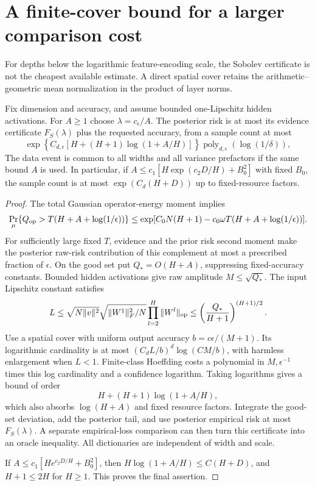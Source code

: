 \section{A finite-cover bound for a larger comparison cost}
\label{sec:amgm-large-cost}
For depths below the logarithmic feature-encoding scale, the Sobolev certificate is not the cheapest available estimate. A direct spatial cover retains the arithmetic--geometric mean normalization in the product of layer norms.

\begin{proposition}[AM--GM certificate]
\label{prop:amgm-certificate}
Fix dimension and accuracy, and assume bounded one-Lipschitz hidden activations. For $A\ge1$ choose $\lambda=c_\epsilon/A$. The posterior risk is at most its evidence certificate $F_S(\lambda)$ plus the requested accuracy, from a sample count at most
\begin{equation}
 \exp\left\{C_{d,\epsilon}\left[H+
              (H+1)\log(1+A/H)\right]\right\}
              \operatorname{poly}_{d,\epsilon}(\log(1/\delta)),
 \label{eq:amgm-sample}
\end{equation}
The data event is common to all widths and all variance prefactors if the same bound $A$ is used. In particular, if
$A\le c_1[H\exp(c_2D/H)+B_0^2]$ with fixed $B_0$, the sample count is at most $\exp(C_d(H+D))$ up to fixed-resource factors.
\end{proposition}
\begin{proof}
The total Gaussian operator-energy moment implies
\[
 \Pr_\mu\{Q_{\rm op}>T(H+A+\log(1/\epsilon))\}
 \le\exp[C_0N(H+1)-c_0\omega T(H+A+\log(1/\epsilon))].
\]
For sufficiently large fixed $T$, evidence and the prior risk second moment make the posterior raw-risk contribution of this complement at most a prescribed fraction of $\epsilon$. On the good set put $Q_*=O(H+A)$, suppressing fixed-accuracy constants. Bounded hidden activations give raw amplitude $M\le\sqrt{Q_*}$. The input Lipschitz constant satisfies
\[
 L\le\sqrt{N\|v\|^2}\sqrt{\|W^1\|_F^2/N}
        \prod_{l=2}^H\|W^l\|_{\mathrm{op}}
 \le\left(\frac{Q_*}{H+1}\right)^{(H+1)/2}.
\]
Use a spatial cover with uniform output accuracy $b=c\epsilon/(M+1)$. Its logarithmic cardinality is at most
$(C_dL/b)^d\log(CM/b)$, with harmless enlargement when $L<1$. Finite-class Hoeffding costs a polynomial in $M,\epsilon^{-1}$ times this log cardinality and a confidence logarithm. Taking logarithms gives a bound of order
\[
 H+(H+1)\log(1+A/H),
\]
which also absorbs $\log(H+A)$ and fixed resource factors. Integrate the good-set deviation, add the posterior tail, and use posterior empirical risk at most $F_S(\lambda)$. A separate empirical-loss comparison can then turn this certificate into an oracle inequality. All dictionaries are independent of width and scale.

If $A\le c_1[H e^{c_2D/H}+B_0^2]$, then
$H\log(1+A/H)\le C(H+D)$, and $H+1\le2H$ for $H\ge1$. This proves the final assertion.
\end{proof}
